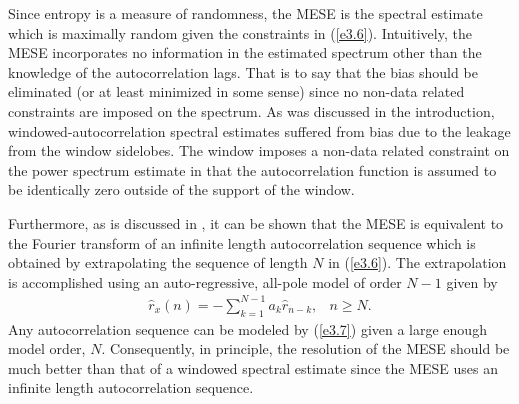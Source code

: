 	Since entropy is a measure of randomness, the
MESE is the spectral estimate which is maximally random
given the constraints in (\ref{e3.6}).  Intuitively, the MESE incorporates
no information in the estimated spectrum other than the knowledge
of the autocorrelation lags.  That is to say that the bias
should be eliminated (or at least minimized in some sense)
since no non-data related constraints are imposed on the spectrum.
As was discussed in the introduction, windowed-autocorrelation
spectral estimates suffered from bias due
to the leakage from the window sidelobes.
The window imposes a non-data related constraint on the
power spectrum estimate in that the autocorrelation function
is assumed to be identically zero outside of the support of 
the window.

	Furthermore, as is discussed in \cite{KM},
it can be shown that the MESE is equivalent to the 
Fourier transform of an infinite length autocorrelation
sequence which is obtained by extrapolating the 
sequence of length $N$ in (\ref{e3.6}).  The extrapolation is accomplished
using an auto-regressive, all-pole model of order $N-1$ given
by
%
\begin{equation}
\begin{array}{cc}
{\displaystyle \hat{r}_x(n) = -\sum_{k=1}^{N-1}a_k\hat{r}_{n-k}}, & n\ge N.
\label{e3.7}
\end{array}
\end{equation}
%
Any autocorrelation sequence can be modeled by (\ref{e3.7}) given a large enough model order, $N$.
Consequently, in principle, the resolution of the MESE should
be much better than that of a windowed
spectral estimate since the MESE uses an infinite length autocorrelation sequence.

